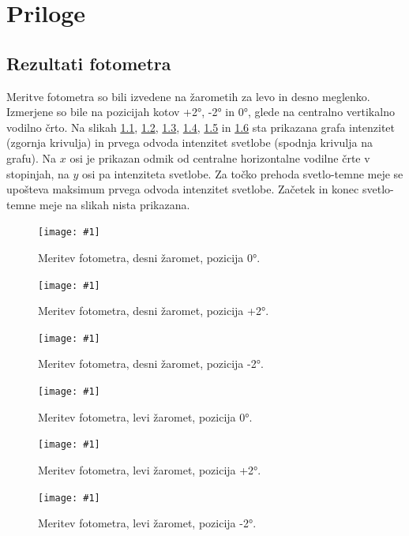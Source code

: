 \documentclass[oneside, a4paper, 12pt]{book}
\newcommand{\slika}[3]{
	\begin{figure}
	\begin{center}
	\texttt{[image: \#1]}
	\end{center}
	\vspace{-20pt}
	\caption{#2}
	\label{#3}
	\end{figure}
}
\begin{document}
\chapter{Priloge}
\section{Rezultati fotometra}
\label{ch:rf}
Meritve fotometra so bili izvedene na žarometih za levo in desno meglenko. Izmerjene so bile na pozicijah kotov +2°, -2° in 0°, glede na centralno vertikalno vodilno črto. Na slikah \ref{pic:foto-1}, \ref{pic:foto-2}, \ref{pic:foto-3}, \ref{pic:foto-4}, \ref{pic:foto-5} in \ref{pic:foto-6} sta prikazana grafa intenzitet (zgornja krivulja) in prvega odvoda intenzitet svetlobe (spodnja krivulja na grafu). Na $x$ osi je prikazan odmik od centralne horizontalne vodilne črte v stopinjah, na $y$ osi pa intenziteta svetlobe. Za točko prehoda svetlo-temne meje se upošteva maksimum prvega odvoda intenzitet svetlobe. Začetek in konec svetlo-temne meje na slikah nista prikazana.

\slika{slike/fotometer-desni-0.jpg}
{Meritev fotometra, desni žaromet, pozicija 0°.}{pic:foto-1}

\slika{slike/fotometer-desni-+2.jpg}
{Meritev fotometra, desni žaromet, pozicija +2°.}{pic:foto-2}

\slika{slike/fotometer-desni--2.jpg}
{Meritev fotometra, desni žaromet, pozicija -2°.}{pic:foto-3}

\slika{slike/fotometer-levi-0.jpg}
{Meritev fotometra, levi žaromet, pozicija 0°.}{pic:foto-4}

\slika{slike/fotometer-levi-+2.jpg}
{Meritev fotometra, levi žaromet, pozicija +2°.}{pic:foto-5}

\slika{slike/fotometer-levi--2.jpg}
{Meritev fotometra, levi žaromet, pozicija -2°.}{pic:foto-6}
\end{document}
